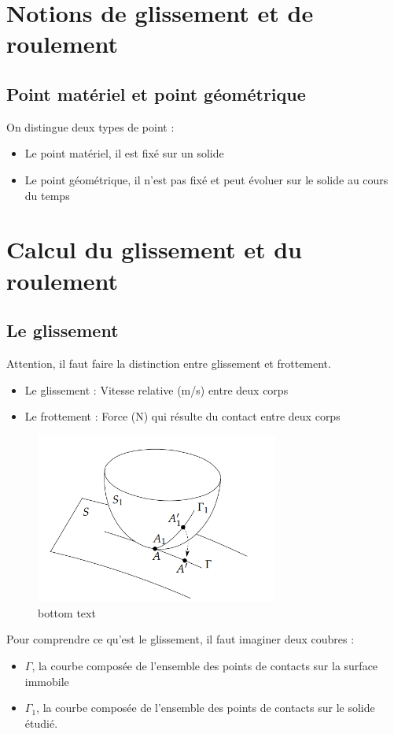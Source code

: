 \section{Notions de glissement et de roulement}

\subsection{Point matériel et point géométrique}
On distingue deux types de point : 
\begin{itemize}
    \item Le point matériel, il est fixé sur un solide
    \item Le point géométrique, il n'est pas fixé et peut évoluer sur le solide au cours du temps
\end{itemize}

\section{Calcul du glissement et du roulement}

\subsection{Le glissement}

Attention, il faut faire la distinction entre glissement et frottement.
\begin{itemize}
    \item Le glissement : Vitesse relative (m/s) entre deux corps 
    \item Le frottement : Force (N) qui résulte du contact entre deux corps
\end{itemize}

\begin{figure}[H]
    \centering
    \includegraphics[width = 8cm]{Images/imagesCinematique/glissementg.png}
    \caption{bottom text}
    \label{fig:my_label}
\end{figure}
Pour comprendre ce qu'est le glissement, il faut imaginer deux coubres : 
\begin{itemize}
    \item $\Gamma$, la courbe composée de l'ensemble des points de contacts sur la surface immobile
    \item $\Gamma_1$, la courbe composée de l'ensemble des points de contacts sur le solide étudié.
\end{itemize}


